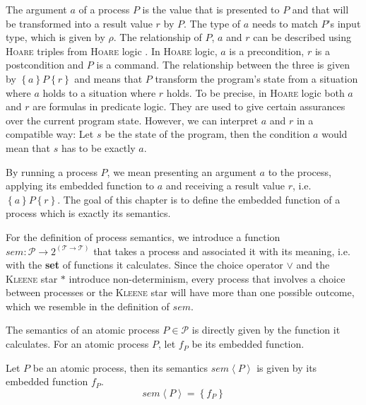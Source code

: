 The argument $a$ of a process $P$ is the value that is presented to $P$ and that will be transformed into a result value $r$ by $P$. The type of $a$ needs to match $P$'s input type, which is given by $\rho$. The relationship of $P$, $a$ and $r$ can be described using \textsc{Hoare} triples from \textsc{Hoare} logic \cite{}. In \textsc{Hoare} logic, $a$ is a precondition, $r$ is a postcondition and $P$ is a command. The relationship between the three is given by $\left\{ a \right\} P \left\{ r \right\}$ and means that $P$ transform the program's state from a situation where $a$ holds to a situation where $r$ holds. To be precise, in \textsc{Hoare} logic both $a$ and $r$ are formulas in predicate logic. They are used to give certain assurances over the current program state. However, we can interpret $a$ and $r$ in a compatible way: Let $s$ be the state of the program, then the condition $a$ would mean that $s$ has to be exactly $a$.

By running a process $P$, we mean presenting an argument $a$ to the process, applying its embedded function to $a$ and receiving a result value $r$, i.e. $\left\{ a \right\} P \left\{ r \right\}$. The goal of this chapter is to define the embedded function of a process which is exactly its semantics.

For the definition of process semantics, we introduce a function $sem \colon \mathcal{P} \to 2^{\left( \mathcal{T} \to \mathcal{T} \right)}$ that takes a process and associated it with its meaning, i.e. with the \textbf{set} of functions it calculates. Since the choice operator $\vee$ and the \textsc{Kleene} star $*$ introduce non-determinism, every process that involves a choice between processes or the \textsc{Kleene} star will have more than one possible outcome, which we resemble in the definition of $sem$.


The semantics of an atomic process $P \in \mathcal{P}$ is directly given by the function it calculates. For an atomic process $P$, let $f_P$ be its embedded function.
\begin{definition}
  \label{def:sem_atomic}
  Let $P$ be an atomic process, then its semantics $sem \left\langle P \right\rangle$ is given by its embedded function $f_P$.
  \begin{equation}
    \label{eqn:sem_atomic}
    sem \left\langle P \right\rangle = \left\{ f_P \right\}
  \end{equation}
  \hfill\qedsymbol
\end{definition}

